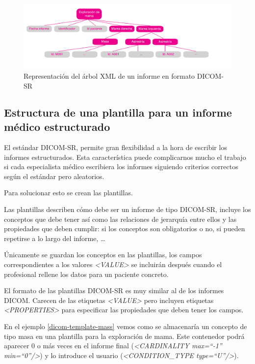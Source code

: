 \begin{figure}[ht]
\centering
\includegraphics[scale=0.7]{./imgs/esquemas/dicomsrTreeReportA.pdf}
\caption{Representación del árbol XML de un informe en formato DICOM-SR}
\label{fig:dicom-report}
\end{figure}

\subsection{Estructura de una plantilla para un informe médico estructurado}\label{dicomsr:plantillas}
El estándar DICOM-SR, permite gran flexibilidad a la hora de escribir los informes estructurados. Esta característica puede complicarnos mucho el trabajo si cada especialista médico escribiera los informes siguiendo criterios correctos según el estándar pero aleatorios.\par
Para solucionar esto se crean las plantillas.\par
Las plantillas describen cómo debe ser un informe de tipo DICOM-SR, incluye los conceptos que debe tener así como las relaciones de jerarquía entre ellos y las propiedades que deben cumplir: si los conceptos son obligatorios o no, si pueden repetirse a lo largo del informe, \ldots\par 
Únicamente se guardan los conceptos en las plantillas, los campos correspondientes a los valores  \textit{<VALUE>} se incluirán después cuando el profesional rellene los datos para un paciente concreto.\par
El formato de las plantillas DICOM-SR es muy similar al de los informes DICOM. Carecen de las etiquetas \textit{<VALUE>} pero incluyen etiquetas \emph{<PROPERTIES>} para especificar las propiedades que deben tener los campos.\par
En el ejemplo \ref{dicom-template-mass} vemos como se almacenaría un concepto de tipo masa en una plantilla para la exploración de mama. Este contenedor podrá aparecer 0 o más veces en el informe final  (\textit{<CARDINALITY max=``-1'' min=``0''/>}) y lo introduce el usuario (\textit{<CONDITION\_TYPE type=``U''/>}).\medskip\par


